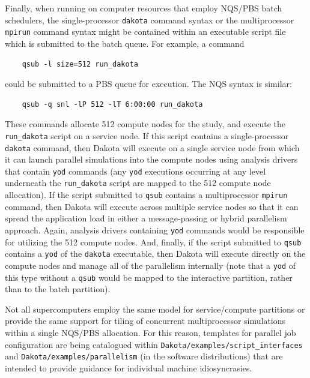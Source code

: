 Finally, when running on computer resources that employ NQS/PBS 
batch schedulers, the single-processor \texttt{dakota} command syntax or the
multiprocessor \texttt{mpirun} command syntax might be contained
within an executable script file which is submitted to the batch
queue. For example, a command
\begin{small}
\begin{verbatim}
    qsub -l size=512 run_dakota
\end{verbatim}
\end{small}

could be submitted to a PBS queue for execution. The NQS syntax is 
similar:
\begin{small}
\begin{verbatim}
    qsub -q snl -lP 512 -lT 6:00:00 run_dakota
\end{verbatim}
\end{small}

These commands allocate 512 compute nodes for the study, and execute
the \texttt{run\_dakota} script on a service node. If this script
contains a single-processor \texttt{dakota} command, then Dakota will
execute on a single service node from which it can launch parallel
simulations into the compute nodes using analysis drivers that contain
\texttt{yod} commands (any \texttt{yod} executions occurring at any
level underneath the \texttt{run\_dakota} script are mapped to the 512
compute node allocation). If the script submitted to \texttt{qsub}
contains a multiprocessor \texttt{mpirun} command, then Dakota will
execute across multiple service nodes so that it can spread the
application load in either a message-passing or hybrid parallelism
approach. Again, analysis drivers containing \texttt{yod} commands
would be responsible for utilizing the 512 compute nodes. And,
finally, if the script submitted to \texttt{qsub} contains a
\texttt{yod} of the \texttt{dakota} executable, then Dakota will
execute directly on the compute nodes and manage all of the
parallelism internally (note that a \texttt{yod} of this type without
a \texttt{qsub} would be mapped to the interactive partition, rather
than to the batch partition).

Not all supercomputers employ the same model for service/compute
partitions or provide the same support for tiling of concurrent
multiprocessor simulations within a single NQS/PBS allocation.  For
this reason, templates for parallel job configuration are being
catalogued within {\tt Dakota/examples/script\_interfaces} and 
\texttt{Dakota/examples/parallelism} (in the software
distributions) that are intended to provide guidance for individual
machine idiosyncrasies.


